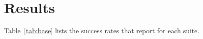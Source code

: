 \documentclass{article}
\begin{document}
\section{Results}
Table~\ref{tab:base} lists the success rates that \citet{kim} report for each suite.

\begin{table}[t]
\centering

\end{table}



\end{document}
